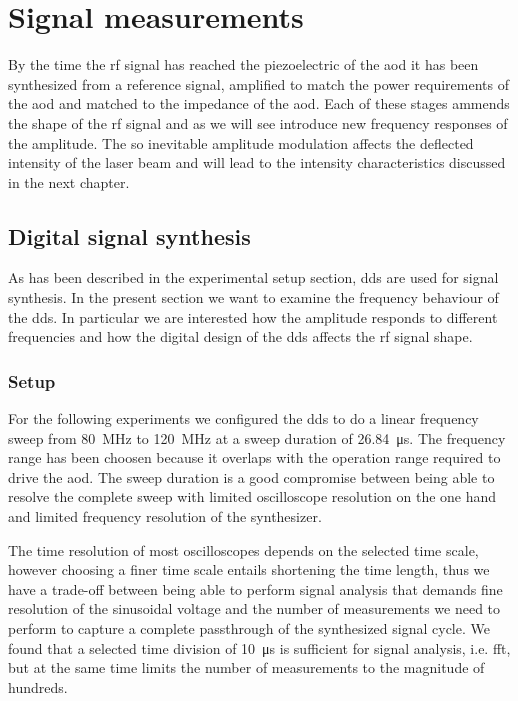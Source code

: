 \chapter{Signal measurements}

By the time the \gls{rf} signal has reached the piezoelectric of the
\gls{aod} it has been synthesized from a reference signal, amplified to match
the power requirements of the \gls{aod} and matched to the impedance of the
\gls{aod}. Each of these stages ammends the shape of the \gls{rf} signal and
as we will see introduce new frequency responses of the amplitude. The so
inevitable amplitude modulation affects the deflected intensity of the laser
beam and will lead to the intensity characteristics discussed in the next
chapter.

\section{Digital signal synthesis}

As has been described in the experimental setup section, \gls{dds} are used
for signal synthesis. In the present section we want to examine the
frequency behaviour of the \gls{dds}. In particular we are interested how the
amplitude responds to different frequencies and how the digital design of the
\gls{dds} affects the \gls{rf} signal shape.

\subsection{Setup}

For the following experiments we configured the \gls{dds} to do a linear
frequency sweep from \SI{80}{\mega\hertz} to \SI{120}{\mega\hertz} at a sweep
duration of \SI{26.84}{\micro\second}. The frequency range has been choosen
because it overlaps with the operation range required to drive the \gls{aod}.
The sweep duration is a good compromise between being able to resolve the
complete sweep with limited oscilloscope resolution on the one hand and
limited frequency resolution of the synthesizer.

The time resolution of most oscilloscopes depends on the selected time scale,
however choosing a finer time scale entails shortening the time length, thus
we have a trade-off between being able to perform signal analysis that demands
fine resolution of the sinusoidal voltage and the number of measurements we
need to perform to capture a complete passthrough of the synthesized signal
cycle. We found that a selected time division of \SI{10}{\micro\second} is
sufficient for signal analysis, i.e. \gls{fft}, but at the same time limits
the number of measurements to the magnitude of hundreds.

